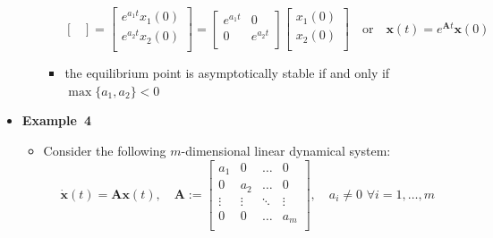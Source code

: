 \documentclass[12pt,a4paper]{article}
\begin{document}
\begin{itemize}
\begin{itemize}
\begin{itemize}
\begin{equation}
\begin{bmatrix}
      \end{bmatrix}
      = 
      \begin{bmatrix}
        e^{a_{1}t}x_{1}(0) \\
        e^{a_{2}t}x_{2}(0) \\
      \end{bmatrix}
      =
      \begin{bmatrix}
        e^{a_{1}t} & 0 \\
        0 & e^{a_{2}t} \\
      \end{bmatrix}
      \begin{bmatrix}
        x_{1}(0) \\
        x_{2}(0) \\
      \end{bmatrix}
      \quad\text{or}\quad
      \bm{x}(t) = e^{\bm{A}t}\bm{x}(0)
      \end{equation}
    \item the equilibrium point is asymptotically stable if and only if $\max\{a_{1}, a_{2}\}<0$
    \end{itemize}
  \end{itemize}

\item \textbf{Example~4}
  \begin{itemize}
  \item Consider the following $m$-dimensional linear dynamical system:
    \begin{equation}\nonumber%
      \dot{\bm{x}}(t)
      =
      \bm{A}
      \bm{x}(t),
      \quad
      \bm{A}:=
      \begin{bmatrix}
        a_{1} & 0 & \ldots & 0 \\
        0 & a_{2} & \ldots & 0 \\
        \vdots & \vdots & \ddots & \vdots \\
        0 & 0 & \ldots & a_{m} \\
      \end{bmatrix},
      \quad a_{i} \neq 0 \,\, \forall i = 1, \ldots, m
    \end{equation}


\end{itemize}
\end{itemize}
\end{document}

